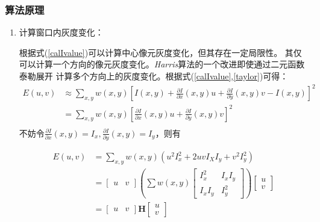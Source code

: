     \subsubsection{算法原理}
        \begin{enumerate}
            \item 计算窗口内灰度变化：

            \hspace{20pt}根据式(\ref{calIvalue})可以计算中心像元灰度变化，但其存在一定局限性。
            其仅可以计算一个方向的像元灰度变化。\textit{Harris}算法的一个改进即使通过二元函数泰勒展开
            计算多个方向上的灰度变化。根据式(\ref{calIvalue},\ref{taylor})可得：
            \begin{equation}
                \begin{aligned}
                    E(u,v) & \approx \sum_{x,y} w(x,y) [I(x,y) + \frac{\partial I}{\partial x}(x,y)u + \frac{\partial I}{\partial y}(x,y)v -I(x,y)]^2 \\
                           & = \sum_{x,y} w(x,y) [\frac{\partial I}{\partial x}(x,y)u + \frac{\partial I}{\partial y}(x,y)v ]^2 \\
                \end{aligned}
            \end{equation}
            不妨令$\frac{\partial I}{\partial x}(x,y) = I_x,\frac{\partial I}{\partial y}(x,y)=I_y$，则有

            \begin{equation}
                \begin{aligned}
                    \label{harrisEuv}
                    E(u,v)&=\sum_{x,y} w(x,y) (u^2 I_x^2 + 2uv I_X I_y + v^2 I_y^2)\\
                            &=\begin{bmatrix}u & v\end{bmatrix} (\sum w(x,y) \begin{bmatrix} I_x^2 & I_x I_y \\ I_x I_y & I_y^2 \end{bmatrix})  \begin{bmatrix}u \\ v\end{bmatrix} \\
                            & = \begin{bmatrix}u & v\end{bmatrix} \bm{H} \begin{bmatrix}u \\ v\end{bmatrix}
                \end{aligned}
            \end{equation}


\end{enumerate}
